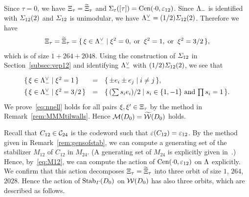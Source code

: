 \documentclass{amsart} %
\begin{document}
%
Since $\tau=0$,
we have $\Xi_{\tau}=\widetilde{\Xi}_{\tau}$ and $\Sigma_{\varepsilon}([\tau])=\mathrm{Cen}(\cdot 0, \varepsilon_{12})$.
Since $\Lambda_{-}$ is identified with $\varSigma_{12}(2)$ and $\varSigma_{12}$ is unimodular,
we have $\Lambda_{-}^{\vee}= (1/2)\varSigma_{12}(2)$.
Therefore we have 
\[
\Xi_{\tau}=\widetilde{\Xi}_{\tau}=\{\,{\xi\in \Lambda_{-}^{\vee}}\mid {\xi^2=0, \;\textrm{or}\; \; \xi^2=1, \;\textrm{or}\; \; \xi^2=3/2} \,\},
\]
which is of size $1+264+2048$.
Using the construction of $\varSigma_{12}$ in Section~\ref{subsec:vep12} and 
identifying  $\Lambda_{-}^{\vee}$ with $ (1/2)\varSigma_{12}(2)$,
we see that 
\[
\renewcommand{\arraystretch}{1.4}
\begin{array}{lcl}
\set{\xi\in \Leechminus\dual}{\xi^2=1} &=& \set{\pm  e_i\pm  e_j}{i\ne j}, \\
\set{\xi\in \Leechminus\dual}{\xi^2=3/2} &=& \set{(\sum s_i e_i)/2}{\textrm{$s_i\in \{1, -1\}$ and $\prod s_i=1$}}. \\
\end{array}
\]
%
%
We prove~\eqref{eq:nnell} holds for all pairs $\xi, \xi^{\prime}\in \Xi_{\tau}$
by the method in Remark~\ref{rem:MMMtilwalls}.
Hence 
$\mathord{\mathcal{M}}(D_0)=\widetilde{\mathord{\mathcal{W}}}(D_0)$ holds.
%
\par 
%
Recall that $C_{12}\in \mathord{\mathcal{C}}_{24}$ is the codeword such that $\varepsilon(C_{12})=\varepsilon_{12}$. %
By the method given in Remark~\ref{rem:gensofstab}, 
we can compute a generating set of 
the stabilizer $M_{12}$ of $C_{12}$ in $M_{24}$.
(A generating set of $M_{24}$ is explicitly given in~\cite[Chapter 10, Section 2]{theCSbook}.)
Hence, by~\eqref{eq:M12},
we can compute the action of $\mathrm{Cen}(\cdot 0, \varepsilon_{12})$ on $\Lambda$ explicitly.
We confirm that this action decomposes $\Xi_{\tau}=\widetilde{\Xi}_{\tau}$
into three orbit of size $1$, $264$, $2028$.
Hence the action of $\operatorname{Stab}_{\varGamma}(D_0)$ on $\mathord{\mathcal{W}}(D_0)$ 
has also three orbits,
which are described as follows.
%
\end{document}
